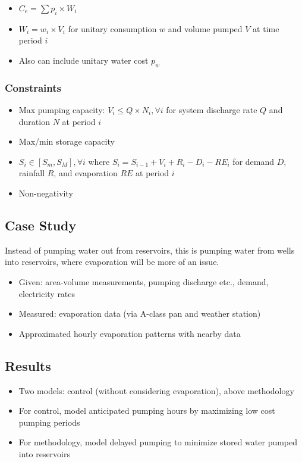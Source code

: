 \documentclass{article}
\begin{document}
\begin{itemize}
    \item $C_e = \sum p_i \times W_i$
    \item $W_i = w_i \times V_i$ for unitary consumption $w$ and volume pumped $V$ at time period $i$
    \item Also can include unitary water cost $p_w$
\end{itemize}

\subsubsection{Constraints}

\begin{itemize}
    \item Max pumping capacity: $V_i \leq Q \times N_i, \forall i$ for system discharge rate $Q$ and duration $N$ at period $i$
    \item Max/min storage capacity
    \item $S_i \in [S_m, S_M], \forall i$ where $S_i = S_{i-1} + V_i + R_i - D_i - RE_i$ for demand $D$, rainfall $R$, and evaporation $RE$ at period $i$
    \item Non-negativity
\end{itemize}

\subsection{Case Study}

Instead of pumping water out from reservoirs, this is pumping water from wells into reservoirs, where evaporation will be more of an issue.

\begin{itemize}
    \item Given: area-volume measurements, pumping discharge etc., demand, electricity rates
    \item Measured: evaporation data (via A-class pan and weather station)
    \item Approximated hourly evaporation patterns with nearby data
\end{itemize}

\subsection{Results}

\begin{itemize}
    \item Two models: control (without considering evaporation), above methodology
    \item For control, model anticipated pumping hours by maximizing low cost pumping periods
    \item For methodology, model delayed pumping to minimize stored water pumped into reservoirs
\end{itemize}
\end{document}
